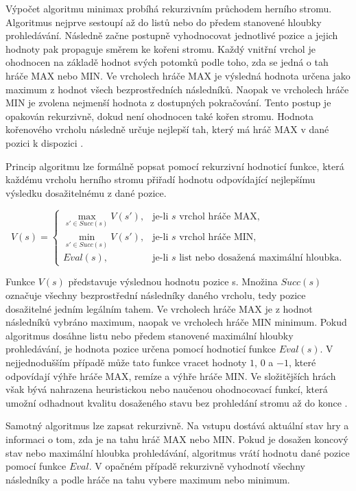 Výpočet algoritmu minimax probíhá rekurzivním průchodem herního stromu. Algoritmus nejprve sestoupí až do listů nebo do předem stanovené
hloubky prohledávání. Následně začne postupně vyhodnocovat jednotlivé pozice a jejich hodnoty pak propaguje směrem ke kořeni stromu. Každý vnitřní 
vrchol je ohodnocen na základě hodnot svých potomků podle toho, zda se jedná o tah hráče MAX nebo MIN. Ve vrcholech hráče MAX je výsledná hodnota 
určena jako maximum z hodnot všech bezprostředních následníků. Naopak ve vrcholech hráče MIN je zvolena nejmenší hodnota z dostupných pokračování.
Tento postup je opakován rekurzivně, dokud není ohodnocen také kořen stromu. Hodnota kořenového vrcholu následně určuje nejlepší tah, který má hráč 
MAX v dané pozici k dispozici \cite{russell2021aima}.

Princip algoritmu lze formálně popsat pomocí rekurzivní hodnoticí funkce, která každému vrcholu herního stromu přiřadí hodnotu odpovídající
nejlepšímu výsledku dosažitelnému z dané pozice.

\[
V(s)=
\begin{cases}
\max\limits_{s' \in Succ(s)} V(s'), & \text{je-li } s \text{ vrchol hráče MAX},\\[1ex]
\min\limits_{s' \in Succ(s)} V(s'), & \text{je-li } s \text{ vrchol hráče MIN},\\[1ex]
Eval(s), & \text{je-li } s \text{ list nebo dosažená maximální hloubka.}
\end{cases}
\]

Funkce $V(s)$ představuje výslednou hodnotu pozice s. Množina $Succ(s)$ označuje všechny bezprostřední následníky daného vrcholu, 
tedy pozice dosažitelné jedním legálním tahem. Ve vrcholech hráče MAX je z hodnot následníků vybráno maximum, naopak ve vrcholech
hráče MIN minimum. Pokud algoritmus dosáhne listu nebo předem stanovené maximální hloubky prohledávání, je hodnota pozice
určena pomocí hodnoticí funkce $Eval(s)$. V nejjednodušším případě může tato funkce vracet hodnoty $1$, $0$ a $-1$, které odpovídají výhře hráče MAX,
remíze a výhře hráče MIN. Ve složitějších hrách však bývá nahrazena heuristickou nebo naučenou ohodnocovací funkcí, která umožní odhadnout
kvalitu dosaženého stavu bez prohledání stromu až do konce \cite{russell2021aima}.

Samotný algoritmus lze zapsat rekurzivně. Na vstupu dostává aktuální stav hry a informaci o tom, zda je na tahu hráč MAX nebo MIN. Pokud 
je dosažen koncový stav nebo maximální hloubka prohledávání, algoritmus vrátí hodnotu dané pozice pomocí funkce $Eval$. V opačném případě 
rekurzivně vyhodnotí všechny následníky a podle hráče na tahu vybere maximum nebo minimum.

